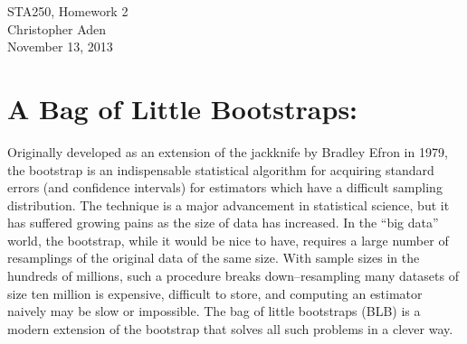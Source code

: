 \documentclass[12pt]{article}
\begin{document}
\begin{center}
STA250, Homework 2 \\
Christopher Aden\\
November 13, 2013\
\end{center}

\section*{A Bag of Little Bootstraps:}
Originally developed as an extension of the jackknife by Bradley Efron in 1979, the bootstrap is an indispensable statistical algorithm for acquiring standard errors (and confidence intervals) for estimators which have a difficult sampling distribution. The technique is a major advancement in statistical science, but it has suffered growing pains as the size of data has increased. In the ``big data'' world, the bootstrap, while it would be nice to have, requires a large number of resamplings of the original data of the same size. With sample sizes in the hundreds of millions, such a procedure breaks down--resampling many datasets of size ten million is expensive, difficult to store, and computing an estimator naively may be slow or impossible. The bag of little bootstraps (BLB) is a modern extension of the bootstrap that solves all such problems in a clever way.
\end{document}
